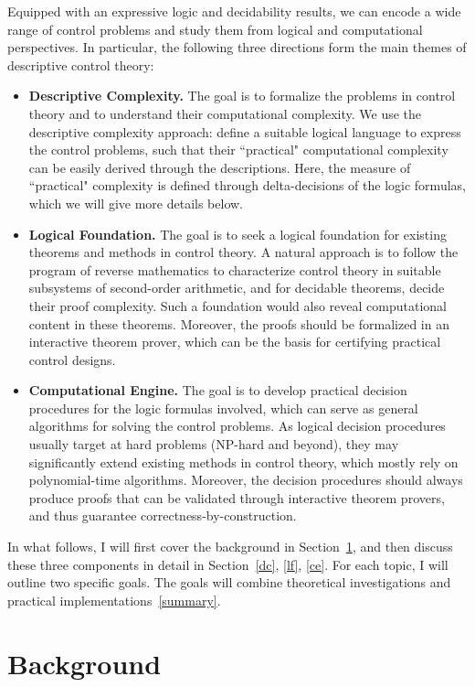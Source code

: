 \documentclass[11pt]{article}
\theoremstyle{definition}
\begin{document}
Equipped with an expressive logic and decidability results, we can encode a wide range of control problems and study them from logical and computational perspectives. In particular, the following three directions form the main themes of descriptive control theory: 
\begin{itemize}
\item {\bf Descriptive Complexity.} The goal is to formalize the problems in control theory and to understand their computational complexity. We use the descriptive complexity approach: define a suitable logical language to express the control problems, such that their ``practical" computational complexity can be easily derived through the descriptions. Here, the measure of ``practical" complexity is defined through delta-decisions of the logic formulas, which we will give more details below. 
\item {\bf Logical Foundation.} The goal is to seek a logical foundation for existing theorems and methods in control theory. A natural approach is to follow the program of reverse mathematics to characterize control theory in suitable subsystems of second-order arithmetic, and for decidable theorems, decide their proof complexity. Such a foundation would also reveal computational content in these theorems. Moreover, the proofs should be formalized in an interactive theorem prover, which can be the basis for certifying practical control designs. 
\item {\bf Computational Engine.} The goal is to develop practical decision procedures for the logic formulas involved, which can serve as general algorithms for solving the control problems. As logical decision procedures usually target at hard problems (NP-hard and beyond), they may significantly extend existing methods in control theory, which mostly rely on polynomial-time algorithms. Moreover, the decision procedures should always produce proofs that can be validated through interactive theorem provers, and thus guarantee correctness-by-construction.
\end{itemize}
In what follows, I will first cover the background in Section~\ref{back}, and then discuss these three components in detail in Section~\ref{dc}, \ref{lf}, \ref{ce}. For each topic, I will outline two specific goals. The goals will combine theoretical investigations and practical implementations~\ref{summary}. 

\section{Background}\label{back}
\end{document}
